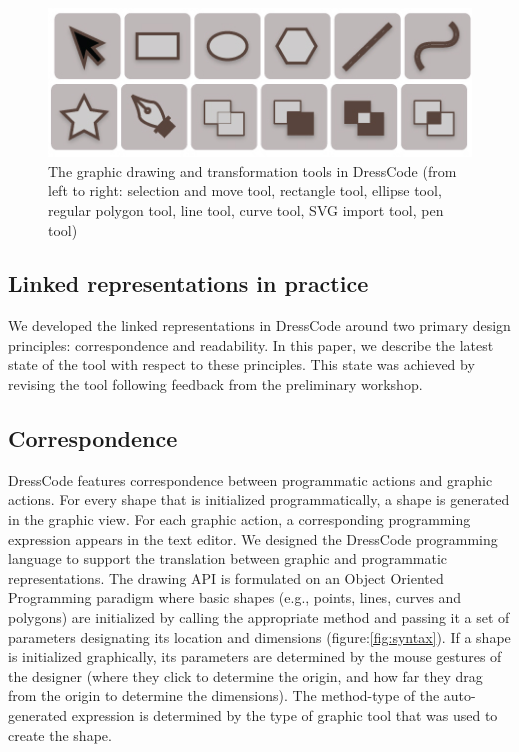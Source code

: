 \documentclass{sigchi}
\begin{document}
\begin{figure}
\begin{center}
\includegraphics[width=0.75\columnwidth]{images/graphic_tools.jpg}
\caption{The graphic drawing and transformation tools in DressCode (from left to right: selection and move tool, rectangle tool, ellipse tool, regular polygon tool, line tool, curve tool, SVG import tool, pen tool)}
\label{fig:graphic_tools}
\end{center}
\end{figure}

\subsection{Linked representations in practice}
We developed the linked representations in DressCode around two primary design principles: correspondence and readability. In this paper, we describe the latest state of the tool with respect to these principles. This state was achieved by revising the tool following feedback from the preliminary workshop.

\subsection{Correspondence}
\label{subsec:correspondence}
DressCode features correspondence between programmatic actions and graphic actions. For every shape that is initialized programmatically, a shape is generated in the graphic view. For each graphic action, a corresponding programming expression appears in the text editor. We designed the DressCode programming language to support the translation between graphic and programmatic representations. The drawing API is formulated on an Object Oriented Programming paradigm where basic shapes (e.g., points, lines, curves and polygons) are initialized by calling the appropriate method and passing it a set of parameters designating its location and dimensions (figure:\ref{fig:syntax}). If a shape is initialized graphically, its parameters are determined by the mouse gestures of the designer (where they click to determine the origin, and how far they drag from the origin to determine the dimensions). The method-type of the auto-generated expression is determined by the type of graphic tool that was used to create the shape.
\end{document}
